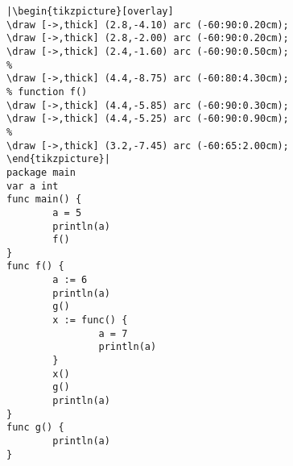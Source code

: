 \begin{lstlisting}[caption=Scope and function literals,label=src:scope3,float]
|\begin{tikzpicture}[overlay]
\draw [->,thick] (2.8,-4.10) arc (-60:90:0.20cm);
\draw [->,thick] (2.8,-2.00) arc (-60:90:0.20cm);
\draw [->,thick] (2.4,-1.60) arc (-60:90:0.50cm);
%
\draw [->,thick] (4.4,-8.75) arc (-60:80:4.30cm);
% function f()
\draw [->,thick] (4.4,-5.85) arc (-60:90:0.30cm);
\draw [->,thick] (4.4,-5.25) arc (-60:90:0.90cm);
%
\draw [->,thick] (3.2,-7.45) arc (-60:65:2.00cm);
\end{tikzpicture}|
package main
var a int
func main() {
        a = 5
        println(a)
        f()
}
func f() {
        a := 6
        println(a)
        g()
        x := func() {
                a = 7
                println(a)
        }
        x()
        g()
        println(a)
}
func g() {
        println(a)
}
\end{lstlisting}

